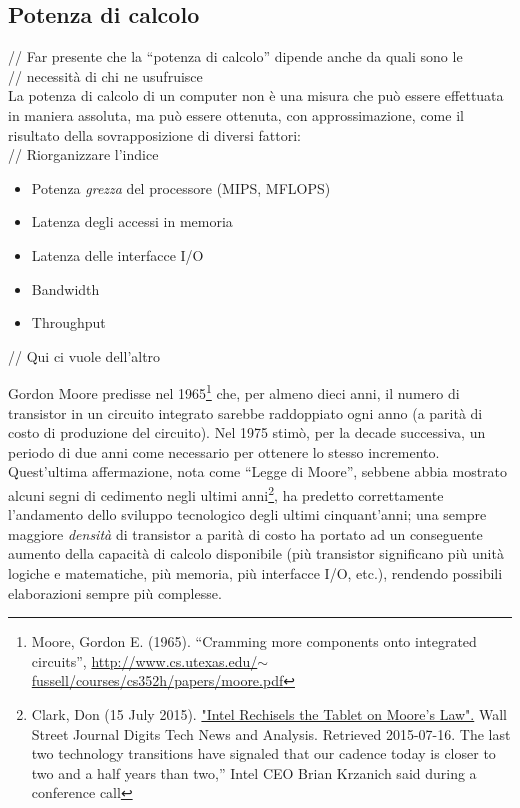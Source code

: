 \subsection{Potenza di calcolo}
// Far presente che la ``potenza di calcolo'' dipende anche da quali sono le \\
// necessità di chi ne usufruisce \\
La potenza di calcolo di un computer non è una misura che può essere effettuata
in maniera assoluta, ma può essere ottenuta, con approssimazione, come il 
risultato della sovrapposizione di diversi fattori:\\
// Riorganizzare l'indice
\begin{itemize}
\item Potenza \emph{grezza} del processore (MIPS, MFLOPS)
\item Latenza degli accessi in memoria
\item Latenza delle interfacce I/O
\item Bandwidth
\item Throughput
\end{itemize}


// Qui ci vuole dell'altro

Gordon Moore predisse nel 1965\footnote{Moore, Gordon E. (1965). ``Cramming more
components onto integrated circuits'', 
\href{http://www.cs.utexas.edu/~fussell/courses/cs352h/papers/moore.pdf}
{http://www.cs.utexas.edu/$\sim$fussell/courses/cs352h/papers/moore.pdf}} che, 
per almeno dieci anni, il numero di transistor in un circuito integrato 
sarebbe raddoppiato ogni anno (a parità di costo di produzione del circuito).
 Nel 1975 stimò, per la decade successiva, un periodo di due anni come 
necessario per ottenere lo stesso incremento. Quest'ultima affermazione, 
nota come ``Legge di Moore'', sebbene abbia mostrato alcuni segni di
cedimento negli ultimi anni\footnote{ Clark, Don (15 July 2015). 
\href{http://blogs.wsj.com/digits/2015/07/16/intel-rechisels-the-tablet-on-
moores-law/}{"Intel Rechisels the Tablet on Moore’s Law".} Wall Street Journal 
Digits Tech News and Analysis. Retrieved 2015-07-16. The last two technology 
transitions have signaled that our cadence today is closer to two and a half
 years than two,” Intel CEO Brian Krzanich said during a conference call}, ha 
predetto correttamente l'andamento dello sviluppo tecnologico degli ultimi
cinquant'anni; una sempre maggiore \emph{densità} di transistor a parità
di costo ha portato ad un conseguente aumento della capacità di calcolo 
disponibile (più transistor significano più unità logiche e matematiche,
più memoria, più interfacce I/O, etc.), rendendo possibili elaborazioni
sempre più complesse.

